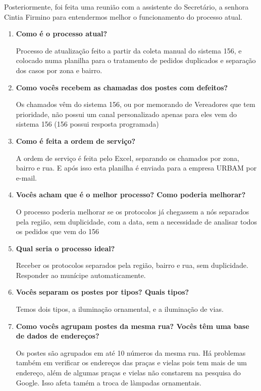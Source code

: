 \documentclass[
	article,			%
	11pt,				%
	oneside,			%
	a4paper,			%
	english,			%
	brazil,				%
	sumario=tradicional
	]{abntex2}
\begin{document}
Posteriormente, foi feita uma reunião com a assistente do Secretário, a senhora
Cintia Firmino para entendermos melhor o funcionamento do processo atual.
\begin{enumerate}

\item \textbf{Como é o processo atual?}

Processo de atualização feito a partir da coleta manual do sistema 156, e
colocado numa planilha para o tratamento de pedidos duplicados e separação
dos casos por zona e bairro.

\item \textbf{Como vocês recebem as chamadas dos postes com defeitos?}

Os chamados vêm do sistema 156, ou por memorando de Vereadores que tem
prioridade, não possui um canal personalizado apenas para eles vem do
sistema 156 (156 possui resposta programada)

\item \textbf{Como é feita a ordem de serviço?}

A ordem de serviço é feita pelo Excel, separando os chamados por zona,
bairro e rua. E após isso esta planilha é enviada para a empresa URBAM por
e-mail.

\item \textbf{Vocês acham que é o melhor processo? Como poderia melhorar?}

O processo poderia melhorar se os protocolos já chegassem a nós separados pela
região, sem duplicidade, com a data, sem a necessidade de analisar todos os
pedidos que vem do 156

\item \textbf{Qual seria o processo ideal?}

Receber os protocolos separados pela região, bairro e rua, sem duplicidade.
Responder ao munícipe automaticamente.

\item \textbf{Vocês separam os postes por tipos? Quais tipos?}

Temos dois tipos, a iluminação ornamental, e a iluminação de vias.

\item \textbf{Como vocês agrupam postes da mesma rua? Vocês têm uma base de dados de
endereços?}

Os postes são agrupados em até 10 números da mesma rua. Há problemas
também em verificar os endereços das praças e vielas pois tem mais de um
endereço, além de algumas praças e vielas não constarem na pesquisa do Google.
Isso afeta tamém a troca de làmpadas ornamentais.


\end{enumerate}
\end{document}
